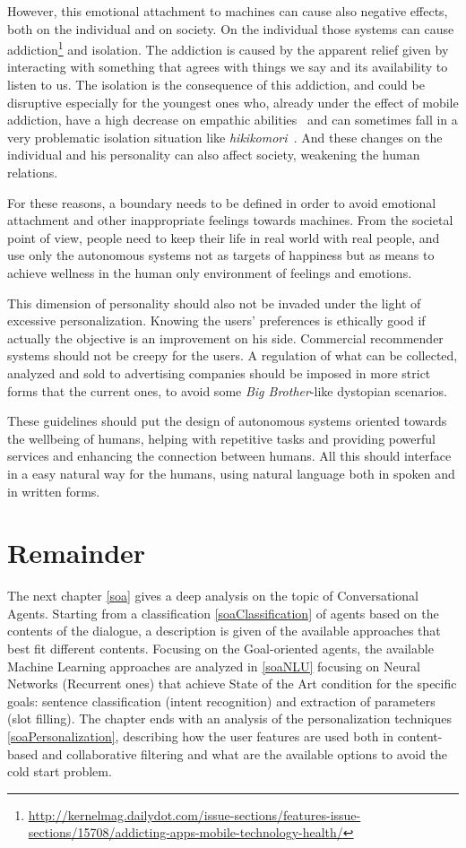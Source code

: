 However, this emotional attachment to machines can cause also negative effects, both on the individual and on society. On the individual those systems can cause addiction\footnote{\url{http://kernelmag.dailydot.com/issue-sections/features-issue-sections/15708/addicting-apps-mobile-technology-health/}} and isolation. The addiction is caused by the apparent relief given by interacting with something that agrees with things we say and its availability to listen to us. The isolation is the consequence of this addiction, and could be disruptive especially for the youngest ones who, already under the effect of mobile addiction, have a high decrease on empathic abilities~\cite{konrath2011changes} and can sometimes fall in a very problematic isolation situation like \textit{hikikomori~\cite{furlong2008japanese}}. And these changes on the individual and his personality can also affect society, weakening the human relations.

For these reasons, a boundary needs to be defined in order to avoid emotional attachment and other inappropriate feelings towards machines. From the societal point of view, people need to keep their life in real world with real people, and use only the autonomous systems not as targets of happiness but as means to achieve wellness in the human only environment of feelings and emotions.

This dimension of personality should also not be invaded under the light of excessive personalization. Knowing the users' preferences is ethically good if actually the objective is an improvement on his side. Commercial recommender systems should not be creepy for the users. A regulation of what can be collected, analyzed and sold to advertising companies should be imposed in more strict forms that the current ones, to avoid some \textit{Big Brother}-like dystopian scenarios.

These guidelines should put the design of autonomous systems oriented towards the wellbeing of humans, helping with repetitive tasks and providing powerful services and enhancing the connection between humans. All this should interface in a easy natural way for the humans, using natural language both in spoken and in written forms.

\section{Remainder}
The next chapter \ref{soa} gives a deep analysis on the topic of Conversational Agents. Starting from a classification \ref{soaClassification} of agents based on the contents of the dialogue, a description is given of the available approaches that best fit different contents. Focusing on the Goal-oriented agents, the available Machine Learning approaches are analyzed in \ref{soaNLU} focusing on Neural Networks (Recurrent ones) that achieve State of the Art condition for the specific goals: sentence classification (intent recognition) and extraction of parameters (slot filling). The chapter ends with an analysis of the personalization techniques \ref{soaPersonalization}, describing how the user features are used both in content-based and collaborative filtering and what are the available options to avoid the cold start problem.

